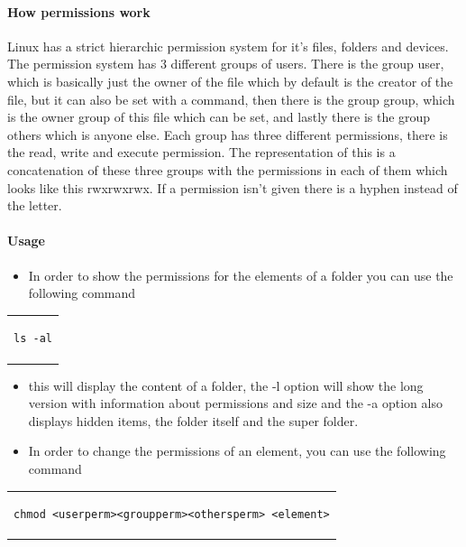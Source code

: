 \documentclass[a4paper,10pt]{article}
\begin{document}
\paragraph{How permissions work}

Linux has a strict hierarchic permission system for it's files, folders and devices. The permission system has 3 different groups of users. There is the group user, which is basically just the owner of the file which by default is the creator of the file, but it can also be set with a command, then there is the group group, which is the owner group of this file which can be set, and lastly there is the group others which is anyone else. Each group has three different permissions, there is the read, write and execute permission. The representation of this is a concatenation of these three groups with the permissions in each of them which looks like this rwxrwxrwx. If a permission isn't given there is a hyphen instead of the letter.
\paragraph{Usage}

\begin{itemize}[leftmargin=*]
\item In order to show the permissions for the elements of a folder you can use the following command
\end{itemize}

\begin{center}
\begin{tabular}{c}
\begin{lstlisting}
ls -al
\end{lstlisting}
\end{tabular}
\end{center}

\begin{itemize}[leftmargin=*]
\item this will display the content of a folder, the -l option will show the long version with information about permissions and size and the -a option also displays hidden items, the folder itself and the super folder. \item In order to change the permissions of an element, you can use the following command
\end{itemize}

\begin{center}
\begin{tabular}{c}
\begin{lstlisting}
chmod <userperm><groupperm><othersperm> <element>
\end{lstlisting}
\end{tabular}
\end{center}
\end{document}
